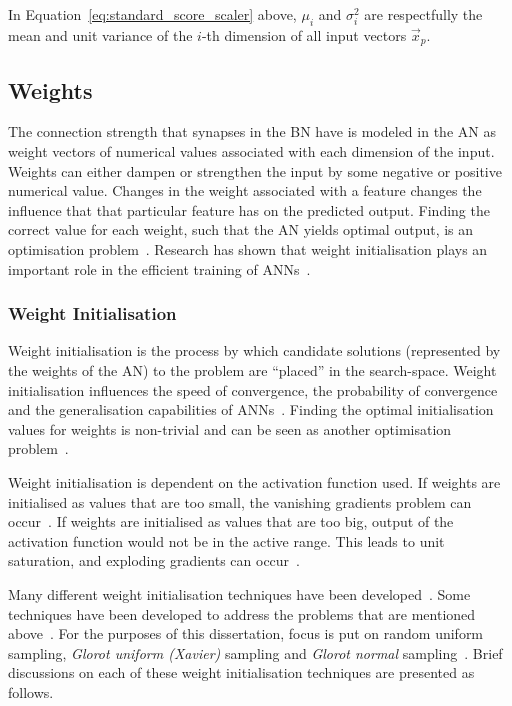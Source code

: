 \noindent
In Equation~\eqref{eq:standard_score_scaler} above, $\mu_i$ and $\sigma^2_i$ are respectfully the mean and unit variance of the $i$-th dimension of all input vectors $\vec{x}_p$.

\subsection{Weights}\label{sec:anns:an:weights}

The connection strength that synapses in the \acs{BN} have is modeled in the \acs{AN} as weight vectors of numerical values associated with each dimension of the input. Weights can either dampen or strengthen the input by some negative or positive numerical value. Changes in the weight associated with a feature changes the influence that that particular feature has on the predicted output. Finding the correct value for each weight, such that the \acs{AN} yields optimal output, is an optimisation problem~\cite{ref:thierens:1993}. Research has shown that weight initialisation plays an important role in the efficient training of \acp{ANN}~\cite{ref:thimm:1995}.

\subsubsection{Weight Initialisation}\label{sec:anns:an:weights:initialisation}

Weight initialisation is the process by which candidate solutions (represented by the weights of the \acs{AN}) to the problem are ``placed'' in the search-space. Weight initialisation influences the speed of convergence, the probability of convergence and the generalisation capabilities of \acp{ANN}~\cite{ref:fernandez:2001}. Finding the optimal initialisation values for weights is non-trivial and can be seen as another optimisation problem~\cite{ref:de:2016, ref:erdogmus:2003, ref:yam:2000}.

Weight initialisation is dependent on the activation function used. If weights are initialised as values that are too small, the vanishing gradients problem can occur~\cite{ref:hanin:2018}. If weights are initialised as values that are too big, output of the activation function would not be in the active range. This leads to unit saturation, and exploding gradients can occur~\cite{ref:hanin:2018, ref:yadav:2018}.

Many different weight initialisation techniques have been developed~\cite{ref:erdogmus:2003}. Some techniques have been developed to address the problems that are mentioned above~\cite{ref:yadav:2018}. For the purposes of this dissertation, focus is put on random uniform sampling, \textit{Glorot uniform (Xavier)} sampling and \textit{Glorot normal} sampling~\cite{ref:glorot:2010}. Brief discussions on each of these weight initialisation techniques are presented as follows.


